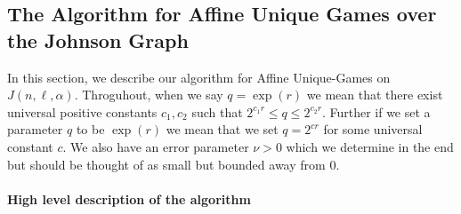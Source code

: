 \subsection{The Algorithm for Affine Unique Games over the Johnson Graph}
In this section, we describe our algorithm for Affine Unique-Games on $J(n,\ell,\alpha)$. Throguhout, when 
we say $q = \exp(r)$ we mean that there exist universal positive constants $c_1, c_2$ such that $2^{c_1 r} \leq q \leq 2^{c_2 r}$. Further if we set a parameter $q$ to be $\exp(r)$ we mean that we set $q = 2^{cr}$ for some universal constant $c$. We also have
an error parameter $\nu>0$ which we determine
in the end but should be thought of as small but bounded away from $0$.

\paragraph{High level description of the algorithm}

